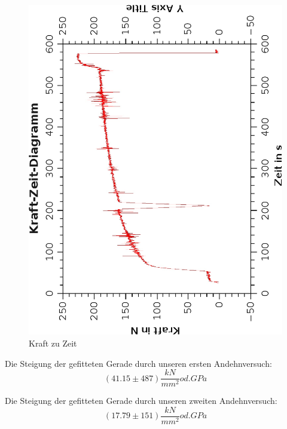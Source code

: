 \documentclass{article}
\begin{document}
\begin{center}
\begin{figure}
\caption{Kraft zu Zeit}
\includegraphics[scale=0.8, angle=-90]{kraftzeitkurve.eps}
\end{figure}
\end{center}
Die Steigung der gefitteten Gerade durch unseren ersten Andehnversuch: 
$$ (41.15 \pm 487) \frac{kN}{mm^2} od. GPa $$

Die Steigung der gefitteten Gerade durch unseren zweiten Andehnversuch:
$$ (17.79 \pm 151) \frac{kN}{mm^2} od. GPa $$
\end{document}
